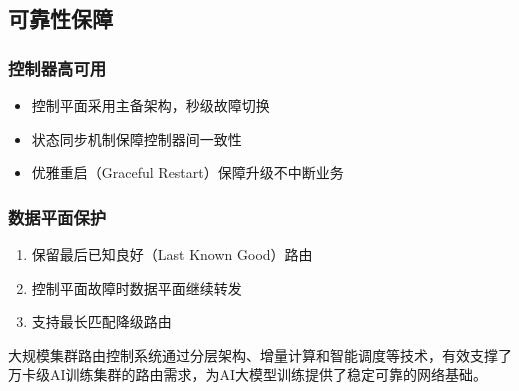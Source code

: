 \subsection{可靠性保障}

\subsubsection{控制器高可用}

\begin{itemize}
    \item 控制平面采用主备架构，秒级故障切换
    \item 状态同步机制保障控制器间一致性
    \item 优雅重启（Graceful Restart）保障升级不中断业务
\end{itemize}

\subsubsection{数据平面保护}

\begin{enumerate}
    \item 保留最后已知良好（Last Known Good）路由
    \item 控制平面故障时数据平面继续转发
    \item 支持最长匹配降级路由
\end{enumerate}

大规模集群路由控制系统通过分层架构、增量计算和智能调度等技术，有效支撑了万卡级AI训练集群的路由需求，为AI大模型训练提供了稳定可靠的网络基础。
